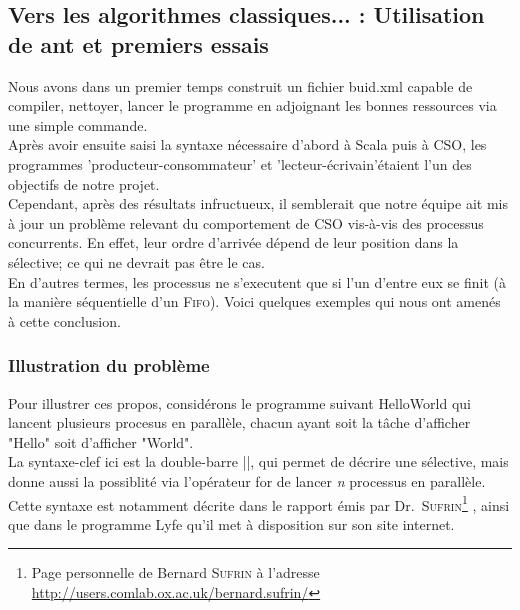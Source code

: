 \documentclass[a4paper,11pt,french]{report}
\begin{document}
\subsection[Vers les algorithmes classiques...]{Vers les algorithmes classiques... : Utilisation de \textsf{ant} et premiers essais}

Nous avons dans un premier temps construit un fichier \textsf{buid.xml} capable de compiler, nettoyer, lancer le programme en adjoignant les bonnes ressources via une simple commande.\\ Après avoir ensuite saisi la syntaxe nécessaire d'abord à Scala puis à CSO, les programmes 'producteur-consommateur' et 'lecteur-écrivain'étaient l'un des objectifs de notre projet.\\

Cependant, après des résultats infructueux, il semblerait que notre équipe ait mis à jour un problème relevant du comportement de CSO vis-à-vis des processus concurrents. En effet, leur ordre d'arrivée dépend de leur position dans la sélective; ce qui ne devrait pas être le cas.\\ 

En d'autres termes, les processus ne s'executent que si l'un d'entre eux se finit (à la manière séquentielle d'un \textsc{Fifo}). Voici quelques exemples qui nous ont amenés à cette conclusion.

\subsubsection{Illustration du problème}

Pour illustrer ces propos, considérons le programme suivant \textsf{HelloWorld} qui lancent plusieurs procesus en parallèle, chacun ayant soit la tâche d'afficher "Hello" soit d'afficher "World".\\
La syntaxe-clef ici est la double-barre ||, qui permet de décrire une sélective, mais donne aussi la possiblité via l'opérateur \textsf{for} de lancer \textit{n} processus en parallèle.\\
Cette syntaxe est notamment décrite dans le rapport émis par Dr.\ \textsc{Sufrin}\footnote{Page personnelle de Bernard \textsc{Sufrin} à l'adresse \url{http://users.comlab.ox.ac.uk/bernard.sufrin/}} \cite{cpa2008-cso}, ainsi que dans le programme Lyfe qu'il met à disposition sur son site internet.
\medskip
\end{document}
